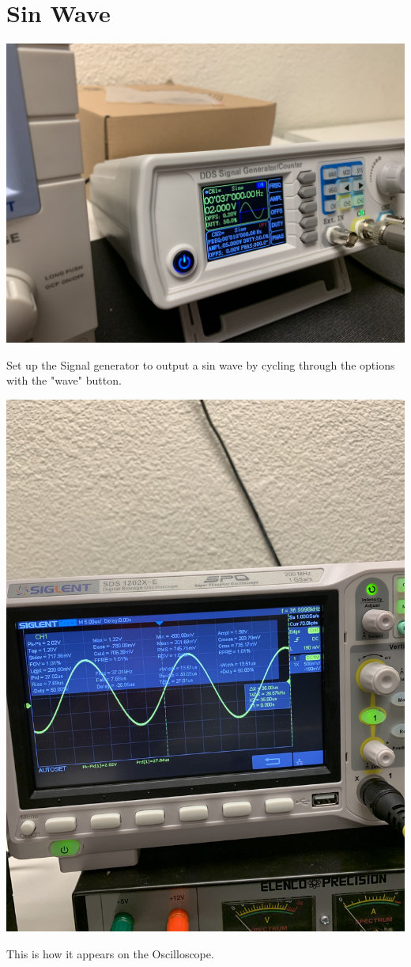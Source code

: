 \documentclass[]{article}
\begin{document}
\section{Sin Wave}
	\begin{center}
		\includegraphics[scale=.05]{sin_func.jpg}\\
	\end{center}
	Set up the Signal generator to output a sin wave by cycling through the options with the "wave" button.\\

	\begin{center}
		\includegraphics[scale=.05]{sin_osci.jpg}\\
	\end{center}
	This is how it appears on the Oscilloscope.
\end{document}
